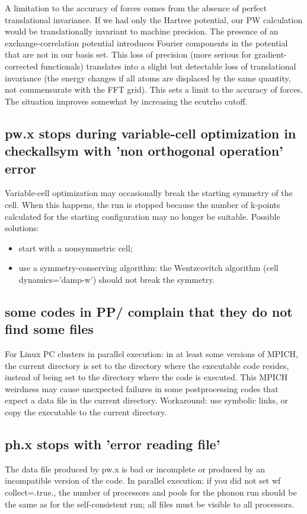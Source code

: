 \documentclass[12pt,a4paper]{article}
\begin{document}
A limitation to the accuracy of forces comes from the absence of perfect
translational invariance. If we had only the Hartree potential, our PW
calculation would be translationally invariant to machine
precision. The presence of an exchange-correlation potential
introduces Fourier components in the potential that are not in our
basis set. This loss of precision (more serious for gradient-corrected
functionals) translates into a slight but detectable loss 
of translational invariance (the energy changes if all atoms are displaced by
the same quantity, not commensurate with the FFT grid). This sets a limit
to the accuracy of forces. The situation improves somewhat by increasing
the ecutrho cutoff.

\subsection{pw.x stops during variable-cell optimization in
  checkallsym with 'non orthogonal operation' error} 
Variable-cell optimization may occasionally break the starting
symmetry of the cell. When this happens, the run is stopped because
the number of k-points calculated for the starting configuration may
no longer be suitable. Possible solutions: 
\begin{itemize}
\item start with a nonsymmetric cell;
\item use a symmetry-conserving algorithm: the Wentzcovitch algorithm
  (cell dynamics='damp-w') should not break the symmetry. 
\end{itemize}

\subsection{some codes in PP/ complain that they do not find some files}
For Linux PC clusters in parallel execution: in at least some versions
of MPICH, the current directory is set to the directory where the executable
code resides, instead of being set to the directory where the code is executed.
This MPICH weirdness may cause unexpected failures in some postprocessing
codes that expect a data file in the current directory. Workaround: use
symbolic links, or copy the executable to the current directory.

\subsection{ph.x stops with 'error reading file'}
The data file produced by pw.x
is bad or incomplete or produced by an incompatible version of the code.
In parallel execution: if you did not set wf collect=.true., the number
of processors and pools for the phonon run should be the same as for the
self-consistent run; all files must be visible to all processors.
\end{document}
